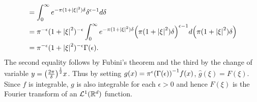 \begin{pf}
\begin{equation*}
\begin{split}
            &= \int_0^\infty e^{-\pi(1+\abs{\xi}^2)\delta}\delta^{\epsilon-1}d\delta \\
            &= \pi^{-\epsilon}(1+\abs{\xi}^2)^{-\epsilon}\int_0^\infty e^{-\pi(1+\abs{\xi}^2)\delta}\pth{\pi(1+\abs{\xi}^2)\delta}^{\epsilon-1}d\pth{\pi(1+\abs{\xi}^2)\delta} \\
            &= \pi^{-\epsilon} (1+\abs{\xi}^2)^{-\epsilon}\Gamma(\epsilon).
        \end{split}
    \end{equation*}
    The second equality follows by Fubini's theorem and the third by the change of variable 
    $y = \pth{\frac{2\pi}{\delta}}^{\frac{1}{2}}x$. Thus by setting 
    $g(x) = \pi^\epsilon\pth{\Gamma(\epsilon)}^{-1}f(x)$, $\hat{g}(\xi) = F(\xi)$. 
    Since $f$ is integrable, $g$ is also integrable for each $\epsilon>0$ and hence 
    $F(\xi)$ is the Fourier transform of an $\mathcal{L}^1(\mathbb{R}^d)$ function.
\end{pf}